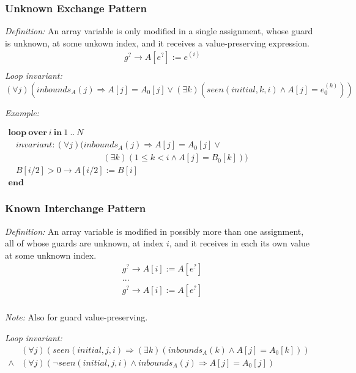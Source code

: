 \documentclass[a4paper,10pt]{article}
\newcommand{\idx}{\ensuremath{i}\xspace}
\newcommand{\idxinitial}{\ensuremath{\mathit{initial}}\xspace}
\newcommand{\KWloop}{\ensuremath{\mathrm{\textbf{loop}}~}}
\newcommand{\KWend}{\ensuremath{\mathrm{\textbf{end}}~}}
\newcommand{\KWover}{\ensuremath{\mathrm{\textbf{over}}~}}
\newcommand{\KWin}{\ensuremath{~\mathrm{\textbf{in}}~}}
\newcommand{\at}[1]{{(#1)}}
\newcommand{\impl}{\ensuremath{\Longrightarrow}}
\newcommand{\inbounds}[2]{\ensuremath{\mathit{inbounds}_{#1}(#2)}\xspace}
\newcommand{\seen}[3]{\ensuremath{\mathit{seen}{(#1,#2,#3)}}\xspace}
\newcommand{\loopinvariant}{\noindent\textit{Loop invariant:}\xspace}
\newcommand{\patterndef}{\noindent\textit{Definition:}\xspace}
\newcommand{\patternexample}{\noindent\textit{Example:}\xspace}
\newcommand{\patternnote}{\noindent\textit{Note:}\xspace}
\begin{document}
\subsubsection*{Unknown Exchange Pattern}

\patterndef An array variable is only modified in a single assignment,
whose guard is unknown, at some unkown index, and it receives a value-preserving expression.
%
\begin{eqnarray*}
&g^? \rightarrow A[e^?] := e^\at{\idx}\\
\end{eqnarray*}
%
\loopinvariant
%
$$(\forall j)(\inbounds{A}{j} \impl A[j] = A_0[j] \lor (\exists k)(\seen{\idxinitial}{k}{\idx} \land A[j] = e_0^\at{k}))$$

\bigskip
\patternexample

\medskip
$\begin{array}{l}
  \KWloop \KWover i \KWin 1~..~N \\
  ~~~~ \textit{invariant}: (\forall j)(\inbounds{A}{j} \impl A[j] = A_0[j] \lor \\
  ~~~~~~~~~~~~~~~~~~~~~~~~~~~~~~~~~~~~~~~~~~~~~~~~~~ (\exists k)(1 \leq k < i \land A[j] = B_0[k]))\\
  ~~~~ B[i/2] > 0 \rightarrow A[i/2] := B[i]\\
  \KWend
\end{array}$

\subsubsection*{Known Interchange Pattern}

\patterndef An array variable is modified in possibly more than one assignment,
all of whose guards are unknown, at index \idx, and it receives in each
its own value at some unknown index.
%
\begin{eqnarray*}
&g^? \rightarrow A[\idx] := A[e^?]\\
&...\\
&g^? \rightarrow A[\idx] := A[e^?]\\
\end{eqnarray*}

\patternnote Also for guard value-preserving.

\medskip
\loopinvariant
%
\begin{eqnarray*}
&(\forall j)(\seen{\idxinitial}{j}{\idx} \impl (\exists k)(\inbounds{A}{k} \land A[j] = A_0[k])) \\
\land&
(\forall j)(\neg \seen{\idxinitial}{j}{\idx} \land \inbounds{A}{j} \impl A[j] = A_0[j])
\end{eqnarray*}
\end{document}
